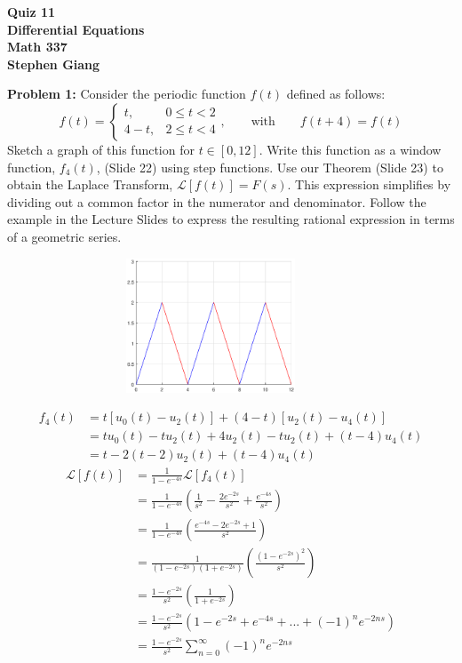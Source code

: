 \documentclass[12pt]{article}
\begin{document}
	
	\begin{center}
		\textbf{Quiz 11} \\
		\textbf{Differential Equations} \\
		\textbf{Math 337} \\
		\textbf{Stephen Giang} \\
	\end{center}

\noindent \textbf{Problem 1: }Consider the periodic function $f(t)$ defined as follows:
	$$
	f(t) = 
	\begin{cases}
		t,  & 0 \leq t < 2 \\
		4-t, & 2\leq t < 4
	\end{cases},
	\qquad \text{with} \qquad 
	f(t+4) = f(t)
	$$
Sketch a graph of this function for $t \in [0, 12]$. Write this function as a window function, $f_4(t)$, (Slide 22) using step functions. Use our Theorem (Slide 23) to obtain the Laplace Transform, $\mathcal{L}[f(t)] = F(s)$. This expression simplifies by dividing out a common factor in the numerator and denominator. Follow the example in the Lecture Slides to express the resulting rational expression in terms of a geometric series.
	\begin{figure}[h]
		\centering
		\includegraphics[width = 10cm,height = 4cm]{Prob1f4}
	\end{figure}
	\begin{align*}
		f_4(t) &= t[u_0(t) - u_2(t)] + (4-t)[u_2(t) - u_4(t)] \\
		&= tu_0(t) - tu_2(t) + 4u_2(t) - tu_2(t) + (t-4)u_4(t) \\
		&= t - 2(t - 2)u_2(t) + (t-4)u_4(t)
	\end{align*}
	\begin{align*}
		\mathcal{L}[f(t)] &= \frac{1}{1 - e^{-4s}}\mathcal{L}[f_4(t)] \\
		&= \frac{1}{1 - e^{-4s}}\left(\frac{1}{s^2} - \frac{2e^{-2s}}{s^2} + \frac{e^{-4s}}{s^2}\right) \\
		&= \frac{1}{1 - e^{-4s}}\left(\frac{e^{-4s} - 2e^{-2s} + 1}{s^2}\right) \\
		&= \frac{1}{(1 - e^{-2s})(1 + e^{-2s}) }\left(\frac{(1 - e^{-2s})^2}{s^2}\right) \\
		&= \frac{1 - e^{-2s}}{s^2} \left(\frac{1}{1 + e^{-2s}}\right) \\
		&= \frac{1 - e^{-2s}}{s^2}\left(1 - e^{-2s} + e^{-4s} + ... + (-1)^ne^{-2ns}\right) \\
		&= \frac{1 - e^{-2s}}{s^2}\sum_{n = 0}^{\infty} (-1)^ne^{-2ns}
	\end{align*}
\end{document}
